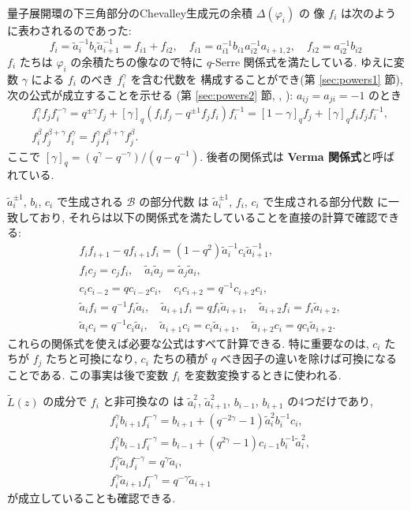 \documentclass[12pt,twoside,dvipdfm]{msjproc}
\theoremstyle{definition} %
\theoremstyle{definition} %
\theoremstyle{definition} %
\numberwithin{theorem}{section}
\numberwithin{equation}{section}
\numberwithin{figure}{section}
\numberwithin{table}{section}
\newcommand\secref[1]{第 \ref{#1} 節}
\newcommand\B{\mathcal{B}}
\newcommand\tL{{\widetilde{L}}}
\newcommand\ta{{\tilde{a}}}
\begin{document}
量子展開環の下三角部分のChevalley生成元の余積 $\Delta(\varphi_i)$ の
像 $f_i$ は次のように表わされるのであった:
\begin{equation*}
  f_i = \ta_i^{-1}b_i\ta_{i+1}^{-1} = f_{i1} + f_{i2}, \quad
  f_{i1} = a_{i1}^{-1}b_{i1}a_{i2}^{-1}a_{i+1,2}, \quad
  f_{i2} = a_{i2}^{-1}b_{i2}
\end{equation*}
$f_i$ たちは $\varphi_i$ の余積たちの像なので特に $q$-Serre 関係式を満たしている. 
ゆえに変数 $\gamma$ による $f_i$ のべき $f_i^\gamma$ を含む代数を
構成することができ(\secref{sec:powers1}), 次の公式が成立することを示せる
(\secref{sec:powers2}, \cite{Kuroki-W}, \cite{Kuroki-Tau}): $a_{ij}=a_{ji}=-1$ のとき
\begin{align*}
 &
 f_i^\gamma f_j f_i^{-\gamma}
 = q^{\pm\gamma}f_j+[\gamma]_q(f_i f_j - q^{\pm1} f_j f_i)f_i^{-1}
 = [1-\gamma]_q f_j + [\gamma]_q f_i f_j f_i^{-1},
 \\ &
 f_i^\beta f_j^{\beta+\gamma} f_i^\gamma
 = f_j^\gamma f_i^{\beta+\gamma} f_j^\beta.
\end{align*}
ここで $[\gamma]_q = (q^\gamma-q^{-\gamma})/(q-q^{-1})$.
後者の関係式は {\bf Verma 関係式}と呼ばれている.

$\ta_i^{\pm 1}$, $b_i$, $c_i$ で生成される $\B$ の部分代数
は $\ta_i^{\pm 1}$, $f_i$, $c_i$ で生成される部分代数
に一致しており, それらは以下の関係式を満たしていることを直接の計算で確認できる:
\begin{align*}
 &
 f_i f_{i+1} - q f_{i+1} f_i = (1-q^2) \ta_i^{-1}c_i\ta_{i+1}^{-1}, 
 \\ &
 f_i c_j = c_j f_i, \quad
 \ta_i\ta_j = \ta_j\ta_i, 
 \\ &
 c_i c_{i-2} = q c_{i-2} c_i, \quad
 c_i c_{i+2} = q^{-1} c_{i+2} c_i, 
 \\ &
 \ta_i     f_i = q^{-1} f_i \ta_i, \quad
 \ta_{i+1} f_i = q      f_i \ta_{i+1}, \quad
 \ta_{i+2} f_i = f_i\ta_{i+2}, 
 \\ &
 \ta_i     c_i = q^{-1} c_i \ta_i, \quad
 \ta_{i+1} c_i =        c_i \ta_{i+1}, \quad
 \ta_{i+2} c_i = q      c_i \ta_{i+2}.
\end{align*}
これらの関係式を使えば必要な公式はすべて計算できる.
特に重要なのは, $c_i$ たちが $f_j$ たちと可換になり, 
$c_i$ たちの積が $q$ べき因子の違いを除けば可換になることである.
この事実は後で変数 $f_i$ を変数変換するときに使われる.

$\tL(z)$ の成分で $f_i$ と非可換なの
は $\ta_i^2$, $\ta_{i+1}^2$, $b_{i-1}$, $b_{i+1}$ の4つだけであり, 
\begin{align*}
 &
 f_i^\gamma b_{i+1} f_i^{-\gamma}
 = b_{i+1} + (q^{-2\gamma}-1)\ta_i^2 b_i^{-1} c_i,
 \\ &
 f_i^\gamma b_{i-1} f_i^{-\gamma}
 = b_{i-1} + (q^{2\gamma}-1)c_{i-1}b_i^{-1}\ta_i^2,
 \\ &
 f_i^\gamma \ta_i f_i^{-\gamma} = q^\gamma \ta_i, 
 \\ &
 f_i^\gamma \ta_{i+1} f_i^{-\gamma} = q^{-\gamma} \ta_{i+1} 
\end{align*}
が成立していることも確認できる.
\end{document}
